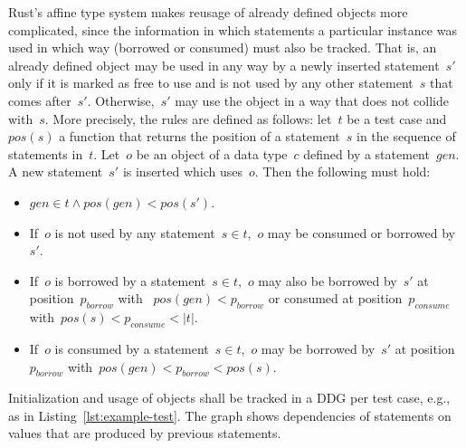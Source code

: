 \documentclass{article}
\begin{document}
Rust's affine type system makes reusage of already defined objects more complicated, since the information in which statements a particular instance was used in which way (borrowed or consumed) must also be tracked. That is, an already defined object may be used in any way by a newly inserted statement~$s'$ only if it is marked as free to use and is not used by any other statement~$s$ that comes after~$s'$. Otherwise,~$s'$ may use the object in a way that does not collide with~$s$. More precisely, the rules are defined as follows: let~$t$ be a test case and $pos(s)$ a function that returns the position of a statement~$s$ in the sequence of statements in~$t$. Let~$o$ be an object of a data type~$c$ defined by a statement~$gen$. A new statement~$s'$ is inserted which uses~$o$. Then the following must hold:
\begin{itemize}
    \item $gen \in t \wedge pos(gen) < pos(s')$.
    \item If~$o$ is not used by any statement~$s \in t$,~$o$ may be consumed or borrowed by~$s'$. 
    \item If~$o$ is borrowed by a statement~$s \in t$,~$o$ may also be borrowed by~$s'$ at position~$p_{borrow}$ with ~$pos(gen) < p_{borrow}$ or consumed at position~$p_{consume}$ with~$pos(s) < p_{consume} < \left|t\right|$. 
    \item If~$o$ is consumed by a statement~$s \in t$,~$o$ may be borrowed by~$s'$ at position~$p_{borrow}$ with~$pos(gen) < p_{borrow} < pos(s)$. 
\end{itemize}

Initialization and usage of objects shall be tracked in a \ac{DDG} per test case, e.g., as in Listing~\ref{lst:example-test}. The graph shows dependencies of statements on values that are produced by previous statements.
\end{document}

